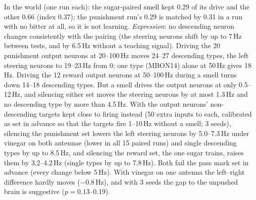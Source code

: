 \documentclass[11pt,a4paper]{article}
\begin{document}
\begin{enumerate}[leftmargin=*, label=\arabic*., itemsep=4pt]
In the world (one run each): the sugar-paired smell kept 0.29 of its drive and the other 0.66 (index 0.37); the punishment run's 0.29 is matched by 0.31 in a run with no bitter at all, so it is not learning. \emph{Expression}: no descending neuron changes consistently with the pairing (the steering neurons shift by up to 7\,Hz between tests, and by 6.5\,Hz without a teaching signal). Driving the 20 punishment output neurons at 20--100\,Hz moves 24--27 descending types, the left steering neurons to 19--23\,Hz from 0; one type (MBON14) alone at 50\,Hz gives 18\,Hz. Driving the 12 reward output neurons at 50--100\,Hz during a smell turns down 14--18 descending types. But a smell drives the output neurons at only 0.5--12\,Hz, and silencing either set moves the steering neurons by at most 1.3\,Hz and no descending type by more than 4.5\,Hz. With the output neurons' non-descending targets kept close to firing instead (50 extra inputs to each, calibrated as set in advance so that the targets fire 1--10\,Hz without a smell; 3 seeds), silencing the punishment set lowers the left steering neurons by 5.0--7.3\,Hz under vinegar on both antennae (lower in all 15 paired runs) and single descending types by up to 8.5\,Hz, and silencing the reward set, the one sugar trains, raises them by 3.2--4.2\,Hz (single types by up to 7.8\,Hz). Both fail the pass mark set in advance (every change below 5\,Hz). With vinegar on one antenna the left--right difference hardly moves ($-$0.8\,Hz), and with 3 seeds the gap to the unpushed brain is suggestive ($p=0.13$--0.19).


\end{enumerate}
\end{document}
